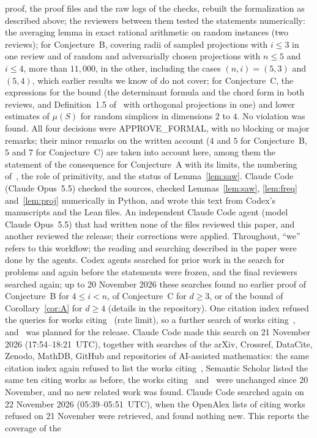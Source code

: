 \documentclass[11pt]{article}
\theoremstyle{definition}
\theoremstyle{remark}
\begin{document}
proof, the proof files and the raw logs of the checks, rebuilt the
formalization as described above; the reviewers between them tested the
statements numerically: the averaging lemma in exact rational arithmetic on
random instances (two reviews); for Conjecture~B, covering radii of sampled
projections with $i\le3$ in one review and of random and adversarially chosen
projections with $n\le5$ and $i\le4$, more than $11{,}000$, in the other,
including the cases $(n,i)=(5,3)$ and $(5,4)$, which earlier results we know
of do not cover; for Conjecture~C, the expressions for the bound (the
determinant formula and the chord form in both reviews, and Definition~1.5
of~\cite{css} with orthogonal projections in one) and lower estimates of
$\mu(S)$ for random simplices in dimensions $2$ to $4$. No
violation was found. All four decisions were APPROVE\_FORMAL, with no
blocking or major remarks; their minor remarks on the written account
($4$ and $5$ for Conjecture~B, $5$ and $7$ for Conjecture~C) are taken into
account here, among them the statement of the consequence for Conjecture~A
with its limits, the numbering of~\cite{gms}, the role of primitivity, and
the status of Lemma~\ref{lem:saw}. Claude Code (Claude Opus~5.5) checked the
sources, checked Lemmas~\ref{lem:saw}, \ref{lem:freq} and~\ref{lem:proj}
numerically in Python, and wrote this text from Codex's manuscripts and the
Lean files. An independent Claude Code agent (model Claude Opus~5.5) that had written none of the files reviewed this paper, and another reviewed the release; their corrections were applied. Throughout, ``we'' refers to this workflow; the
reading and searching described in the paper were done by the agents. Codex
agents searched for prior work in the search for problems and again before
the statements were frozen, and the final reviewers searched again; up to
20 November 2026 these searches found no earlier proof of Conjecture~B for
$4\le i<n$, of Conjecture~C for $d\ge3$, or of the bound of
Corollary~\ref{cor:A} for $d\ge4$ (details in the repository). One citation
index refused the queries for works citing~\cite{css} (rate limit), so a
further search of works citing~\cite{css}, \cite{gms} and~\cite{kr} was
planned for the release. Claude Code made this search on 21 November 2026 (17:54--18:21~UTC), together with searches of the arXiv, Crossref, DataCite, Zenodo, MathDB, GitHub and repositories of AI-assisted mathematics: the same citation index again refused to list the works citing~\cite{css}, Semantic Scholar listed the same ten citing works as before, the works citing~\cite{gms} and~\cite{kr} were unchanged since 20 November, and no new related work was found. Claude Code searched again on 22 November 2026 (05:39--05:51~UTC), when the OpenAlex lists of citing works refused on 21 November were retrieved, and found nothing new. This reports the coverage of the
\end{document}
